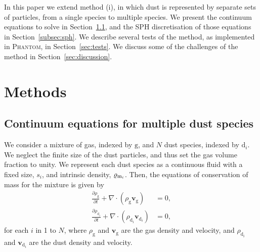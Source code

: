 \documentclass[fleqn,usenatbib]{mnras}
\newcommand{\g}{\mathrm{g}}
\newcommand{\dd}{\mathrm{d}}
\let\vec\bm
\begin{document}
In this paper we extend method (i), in which dust is represented by separate
sets of particles, from a single species to multiple species. We present the
continuum equations to solve in Section~\ref{subsec:continuum}, and the SPH
discretisation of those equations in Section~\ref{subsec:sph}. We describe
several tests of the method, as implemented in \textsc{Phantom}, in
Section~\ref{sec:tests}. We discuss some of the challenges of the method in
Section~\ref{sec:discussion}.

\section{Methods}

\subsection{Continuum equations for multiple dust species}%
\label{subsec:continuum}

We consider a mixture of gas, indexed by \(\g\), and \(N\) dust species, indexed
by \(\dd_i\). We neglect the finite size of the dust particles, and thus set the
gas volume fraction to unity. We represent each dust species as a continuous
fluid with a fixed size, \(s_i\), and intrinsic density, \(\varrho_{{\rm
m}_i}\). Then, the equations of conservation of mass for the mixture is given by
%
\begin{align}
   \label{eqn:conserve-gas-mass}
   \frac{\partial \rho_{\g}}{\partial t} + \nabla \cdot (\rho_{\g} \vec{v}_{\g}) &= 0, \\
   \label{eqn:conserve-dust-mass}
   \frac{\partial \rho_{\dd_i}}{\partial t} + \nabla \cdot (\rho_{\dd_i} \vec{v}_{\dd_i}) &= 0,
\end{align}
%
for each \(i\) in 1 to \(N\), where \(\rho_{\g}\) and \(\vec{v}_{\g}\) are the gas
density and velocity, and \(\rho_{\dd_i}\) and \(\vec{v}_{\dd_i}\) are the dust
density and velocity.
\end{document}
